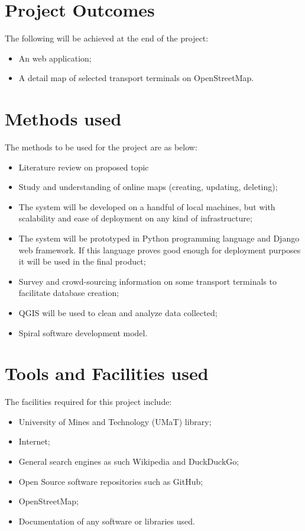 \section{Project Outcomes}
The following will be achieved at the end of the project:
\begin{itemize}
	\item An web application;
	\item A detail map of selected transport terminals on OpenStreetMap.
\end{itemize}


\section{Methods used}
The methods to be used for the project are as below:
\begin{itemize}
	\item Literature review on proposed topic
	\item Study and understanding of online maps (creating, updating, deleting);
	\item The system will be developed on a handful of local machines, but with scalability and ease of deployment on any kind of infrastructure;
	\item The system will be prototyped in Python programming language and Django web framework. If this language proves good enough for deployment purposes it will be used in the final product;
	\item Survey and crowd-sourcing information on some transport terminals to facilitate database creation;
	\item QGIS will be used to clean and analyze data collected;
	\item Spiral software development model.
\end{itemize}

\section{Tools and Facilities used}
The facilities required for this project include:
\begin{itemize}
	\item University of Mines and Technology (UMaT) library;
	\item Internet;
	\item General search engines as such Wikipedia and DuckDuckGo;
	\item Open Source software repositories such as GitHub;
	\item OpenStreetMap;
	\item Documentation of any software or libraries used.
\end{itemize}

